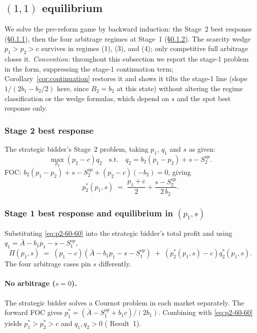 \documentclass[11pt,a4paper]{article}
\theoremstyle{definition}
\theoremstyle{remark}
\theoremstyle{plain}
\begin{document}
\subsection{$(1,1)$ equilibrium}\label{app:state-60-60}

We solve the pre-reform game by backward induction: the Stage~2 best response (\S\ref{app:60-60:stage2}), then the four arbitrage regimes at Stage~1 (\S\ref{app:60-60:stage1}). The scarcity wedge $p_1 > p_2 > c$ survives in regimes (1), (3), and (4); only competitive full arbitrage closes it. \emph{Convention:} throughout this subsection we report the stage-1 problem in the \citeauthor{ito_reguant_2016} form, suppressing the stage-1 continuation term; Corollary~\ref{cor:continuation} restores it and shows it tilts the stage-1 line (slope $1/(2b_1 - b_2/2)$ here, since $B_2 = b_2$ at this state) without altering the regime classification or the wedge formulas, which depend on $s$ and the spot best response only.

\subsubsection{Stage 2 best response}\label{app:60-60:stage2}
The strategic bidder's Stage~2 problem, taking $p_1$, $q_1$ and $s$ as given:
\[
\max_{p_2} (p_2 - c) q_2 \quad\text{s.t.}\quad q_2 = b_2(p_1 - p_2) + s - S^{op}_2.
\]
FOC: $b_2(p_1 - p_2) + s - S^{op}_2 + (p_2 - c)(-b_2) = 0$, giving
\begin{equation}
p_2^*(p_1, s) \;=\; \frac{p_1 + c}{2} + \frac{s - S^{op}_2}{2\, b_2}.
\label{eq:p2-60-60}
\end{equation}

\subsubsection{Stage 1 best response and equilibrium in $(p_1, s)$}\label{app:60-60:stage1}
Substituting \eqref{eq:p2-60-60} into the strategic bidder's total profit and using $q_1 = \bar A - b_1 p_1 - s - S^{op}_1$,
\[
\Pi(p_1, s) \;=\; (p_1 - c)(\bar A - b_1 p_1 - s - S^{op}_1) \;+\; (p_2^*(p_1, s) - c) q_2^*(p_1, s).
\]
The four arbitrage cases pin $s$ differently.

\paragraph{No arbitrage ($s = 0$).} The strategic bidder solves a Cournot problem in each market separately. The forward FOC gives $p_1^* = (\bar A - S^{op}_1 + b_1 c)/(2 b_1)$. Combining with \eqref{eq:p2-60-60} yields $p_1^* > p_2^* > c$ and $q_1, q_2 > 0$ (\citeauthor{ito_reguant_2016} Result~1).
\end{document}
